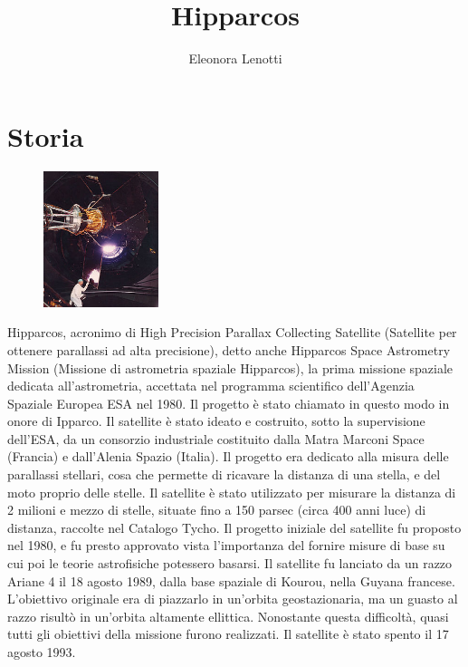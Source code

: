 \documentclass[12pt,a4paper]{article}
\begin{document}
\title{\vspace{-70pt}Hipparcos}
\author{Eleonora Lenotti}
\date{}
\maketitle
\pagestyle{empty}
\thispagestyle{empty}

\section*{Storia}
\label{storia}
\begin{figure}
  \vspace{-10pt}
  \begin{center}
    \includegraphics[width=0.30\textwidth]{satellite}
  \end{center}
  \vspace{-20pt}
\end{figure}
Hipparcos, acronimo di High Precision Parallax Collecting Satellite (Satellite per ottenere parallassi ad alta precisione), detto anche Hipparcos Space Astrometry Mission (Missione di astrometria spaziale Hipparcos), la prima missione spaziale dedicata all'astrometria, accettata nel programma scientifico dell'Agenzia Spaziale Europea ESA nel 1980.
Il progetto è stato chiamato in questo modo in onore di Ipparco.
Il satellite è stato ideato e costruito, sotto la supervisione dell'ESA, da un consorzio industriale costituito dalla Matra Marconi Space (Francia) e dall'Alenia Spazio (Italia).
Il progetto era dedicato alla misura delle parallassi stellari, cosa che permette di ricavare la distanza di una stella, e del moto proprio delle stelle. Il satellite è stato utilizzato per misurare la distanza di 2 milioni e mezzo di stelle, situate fino a 150 parsec (circa 400 anni luce) di distanza, raccolte nel Catalogo Tycho.
Il progetto iniziale del satellite fu proposto nel 1980, e fu presto approvato vista l'importanza del fornire misure di base su cui poi le teorie astrofisiche potessero basarsi. Il satellite fu lanciato da un razzo Ariane 4 il 18 agosto 1989, dalla base spaziale di Kourou, nella Guyana francese. L'obiettivo originale era di piazzarlo in un'orbita geostazionaria, ma un guasto al razzo risultò in un'orbita altamente ellittica. Nonostante questa difficoltà, quasi tutti gli obiettivi della missione furono realizzati. Il satellite è stato spento il 17 agosto 1993.
\end{document}
